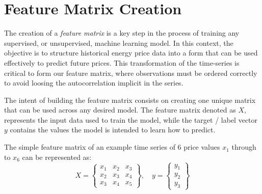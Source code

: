 \documentclass[12pt]{report} %
\begin{document}
\section{Feature Matrix Creation}

The creation of a \textit{feature matrix} is a key step in the process of training any supervised, or unsupervised, machine learning model. In this context, the objective is to structure historical energy price data into a form that can be used effectively to predict future prices. This transformation of the time-series is critical to form our feature matrix, where observations must be ordered correctly to avoid loosing the autocorrelation implicit in the series.

The intent of building the feature matrix consists on creating one unique matrix that can be used across any desired model. The feature matrix denoted as $\mathit{X}$, represents the input data used to train the model, while the target / label vector $\mathit{y}$ contains the values the model is intended to learn how to predict.


The simple feature matrix of an example time series of 6 price values $x_1$ through to $x_6$ can be represented as:
\begin{equation*}
{X} = \begin{Bmatrix}
x_1 & x_2 & x_3 \\
x_2 & x_3 & x_4 \\
x_3 & x_4 & x_5
\end{Bmatrix}, \quad
{y} = \begin{Bmatrix}
y_1 \\
y_2 \\
y_3
\end{Bmatrix}
\end{equation*}
\end{document}
